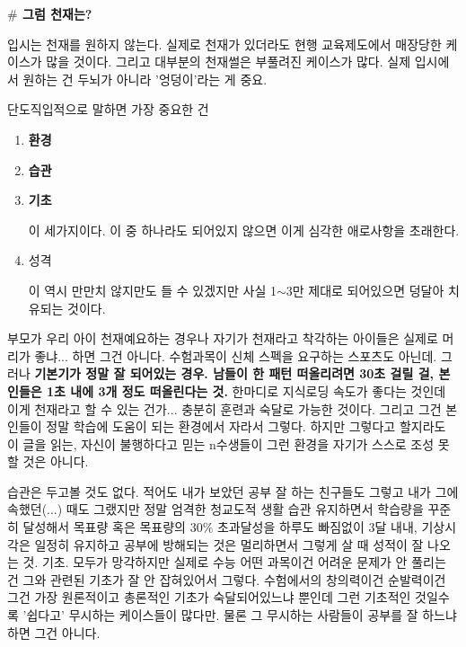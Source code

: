 \textbf{$\#$ 그럼 천재는?}
\vspace{5mm}

입시는 천재를 원하지 않는다. 실제로 천재가 있더라도 현행 교육제도에서 매장당한 케이스가 많을 것이다.
그리고 대부분의 천재썰은 부풀려진 케이스가 많다.
실제 입시에서 원하는 건 두뇌가 아니라 '엉덩이'라는 게 중요.
\vspace{5mm}

단도직입적으로 말하면 가장 중요한 건
\begin{enumerate}
    \item \textbf{ 환경}
    \item \textbf{ 습관}
    \item \textbf{ 기초}

    이 세가지이다. 이 중 하나라도 되어있지 않으면 이게 심각한 애로사항을 초래한다.

    \item 성격

    이 역시 만만치 않지만도 들 수 있겠지만 사실 1$\sim$3만 제대로 되어있으면 덩달아 치유되는 것이다.
\vspace{5mm}
\end{enumerate}

부모가 우리 아이 천재예요하는 경우나 자기가 천재라고 착각하는 아이들은 실제로 머리가 좋냐... 하면 그건 아니다.
수험과목이 신체 스펙을 요구하는 스포츠도 아닌데.
그러나 \textbf{기본기가 정말 잘 되어있는 경우. 남들이 한 패턴 떠올리려면 30초 걸릴 걸, 본인들은 1초 내에 3개 정도 떠올린다는 것.}
한마디로 지식로딩 속도가 좋다는 것인데 이게 천재라고 할 수 있는 건가... 충분히 훈련과 숙달로 가능한 것이다.
그리고 그건 본인들이 정말 학습에 도움이 되는 환경에서 자라서 그렇다.
하지만 그렇다고 할지라도 이 글을 읽는, 자신이 불행하다고 믿는 n수생들이 그런 환경을 자기가 스스로 조성 못할 것은 아니다.
\vspace{5mm}

습관은 두고볼 것도 없다. 적어도 내가 보았던 공부 잘 하는 친구들도 그렇고 내가 그에 속했던(...) 때도 그랬지만
정말 엄격한 청교도적 생활 습관 유지하면서 학습량을 꾸준히 달성해서 목표량 혹은 목표량의 30$\%$ 초과달성을 하루도 빠짐없이 3달 내내,
기상시각은 일정히 유지하고 공부에 방해되는 것은 멀리하면서 그렇게 살 때 성적이 잘 나오는 것.
기초. 모두가 망각하지만 실제로 수능 어떤 과목이건 어려운 문제가 안 풀리는 건 그와 관련된 기초가 잘 안 잡혀있어서 그렇다.
수험에서의 창의력이건 순발력이건 그건 가장 원론적이고 총론적인 기초가 숙달되어있느냐 뿐인데
그런 기초적인 것일수록 '쉽다고' 무시하는 케이스들이 많다만. 물론 그 무시하는 사람들이 공부를 잘 하느냐 하면 그건 아니다.
\vspace{5mm}

